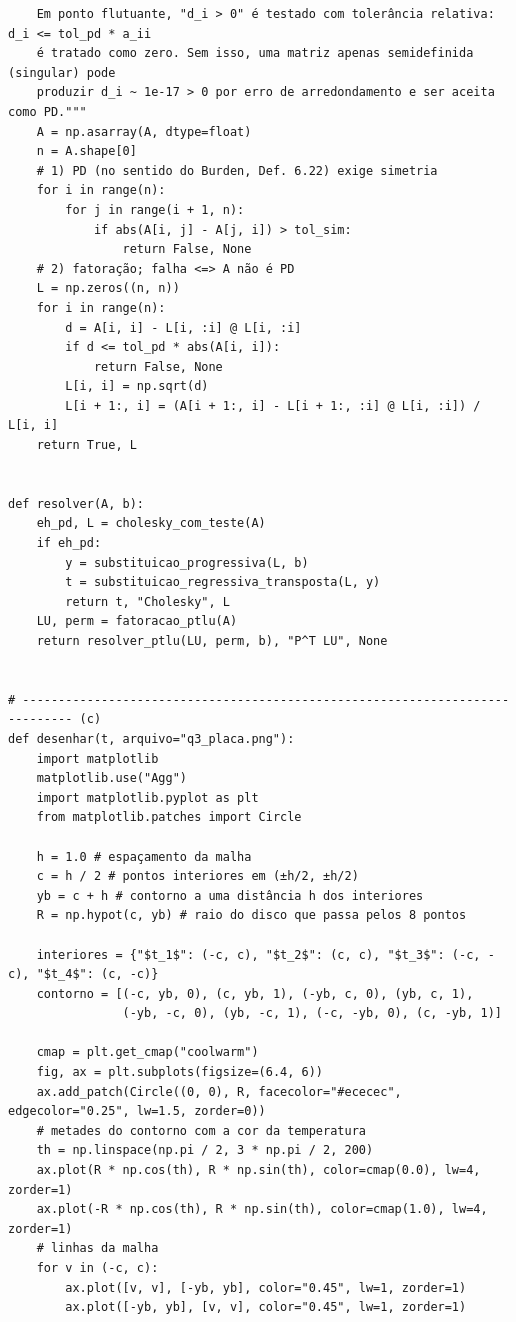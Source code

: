 \documentclass{article}
\theoremstyle{remark}
\begin{document}
\begin{lstlisting}
    Em ponto flutuante, "d_i > 0" é testado com tolerância relativa: d_i <= tol_pd * a_ii
    é tratado como zero. Sem isso, uma matriz apenas semidefinida (singular) pode
    produzir d_i ~ 1e-17 > 0 por erro de arredondamento e ser aceita como PD."""
    A = np.asarray(A, dtype=float)
    n = A.shape[0]
    # 1) PD (no sentido do Burden, Def. 6.22) exige simetria
    for i in range(n):
        for j in range(i + 1, n):
            if abs(A[i, j] - A[j, i]) > tol_sim:
                return False, None
    # 2) fatoração; falha <=> A não é PD
    L = np.zeros((n, n))
    for i in range(n):
        d = A[i, i] - L[i, :i] @ L[i, :i]
        if d <= tol_pd * abs(A[i, i]):
            return False, None
        L[i, i] = np.sqrt(d)
        L[i + 1:, i] = (A[i + 1:, i] - L[i + 1:, :i] @ L[i, :i]) / L[i, i]
    return True, L


def resolver(A, b):
    eh_pd, L = cholesky_com_teste(A)
    if eh_pd:
        y = substituicao_progressiva(L, b)
        t = substituicao_regressiva_transposta(L, y)
        return t, "Cholesky", L
    LU, perm = fatoracao_ptlu(A)
    return resolver_ptlu(LU, perm, b), "P^T LU", None


# ----------------------------------------------------------------------------- (c)
def desenhar(t, arquivo="q3_placa.png"):
    import matplotlib
    matplotlib.use("Agg")
    import matplotlib.pyplot as plt
    from matplotlib.patches import Circle

    h = 1.0 # espaçamento da malha
    c = h / 2 # pontos interiores em (±h/2, ±h/2)
    yb = c + h # contorno a uma distância h dos interiores
    R = np.hypot(c, yb) # raio do disco que passa pelos 8 pontos

    interiores = {"$t_1$": (-c, c), "$t_2$": (c, c), "$t_3$": (-c, -c), "$t_4$": (c, -c)}
    contorno = [(-c, yb, 0), (c, yb, 1), (-yb, c, 0), (yb, c, 1),
                (-yb, -c, 0), (yb, -c, 1), (-c, -yb, 0), (c, -yb, 1)]

    cmap = plt.get_cmap("coolwarm")
    fig, ax = plt.subplots(figsize=(6.4, 6))
    ax.add_patch(Circle((0, 0), R, facecolor="#ececec", edgecolor="0.25", lw=1.5, zorder=0))
    # metades do contorno com a cor da temperatura
    th = np.linspace(np.pi / 2, 3 * np.pi / 2, 200)
    ax.plot(R * np.cos(th), R * np.sin(th), color=cmap(0.0), lw=4, zorder=1)
    ax.plot(-R * np.cos(th), R * np.sin(th), color=cmap(1.0), lw=4, zorder=1)
    # linhas da malha
    for v in (-c, c):
        ax.plot([v, v], [-yb, yb], color="0.45", lw=1, zorder=1)
        ax.plot([-yb, yb], [v, v], color="0.45", lw=1, zorder=1)


\end{lstlisting}
\end{document}
